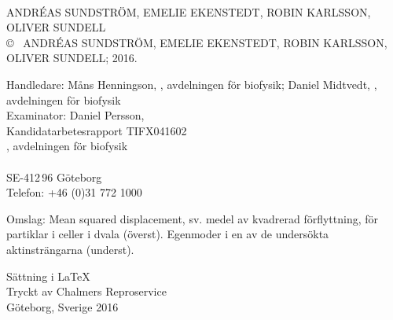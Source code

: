 
\clearpage
{}
\setcounter{page}{2}%
\thispagestyle{plain}

\begin{flushleft}


\vspace*{2cm}
\titel\\
\undertitel

ANDRÉAS SUNDSTRÖM, EMELIE EKENSTEDT, ROBIN KARLSSON, OLIVER SUNDELL \\[1cm]

\copyright ~ ANDRÉAS SUNDSTRÖM, EMELIE EKENSTEDT, ROBIN KARLSSON, OLIVER SUNDELL; 2016. 
\setlength{\parskip}{1cm}


Handledare: Måns Henningson, \institution, avdelningen för biofysik;  Daniel Midtvedt, \institution, avdelningen för biofysik\\
Examinator: Daniel Persson, \institution
\\[1cm]

Kandidatarbetesrapport TIFX04\hspace{.8pt}\raisebox{1pt}{-}\hspace{-.5pt}16\hspace{1.3pt}\raisebox{1.2pt}{-}\hspace{0.5pt}02\\	%
\institution, avdelningen för biofysik\\
\skola\\
SE-412\,96 Göteborg\\
Telefon: +46 (0)31 772 1000 
\setlength{\parskip}{0.5cm}

\vfill
Omslag: Mean squared displacement, sv. medel av kvadrerad förflyttning, för partiklar i celler i dvala (överst). Egenmoder i en av de undersökta aktinsträngarna (underst).
\setlength{\parskip}{1cm}

Sättning i \LaTeX \\
Tryckt av Chalmers Reproservice\\
Göteborg, Sverige 2016
\hfill

\setcounter{footnote}{0} 

\end{flushleft}

\renewcommand{\thefootnote}{\arabic{footnote}}
\setcounter{footnote}{0} 


